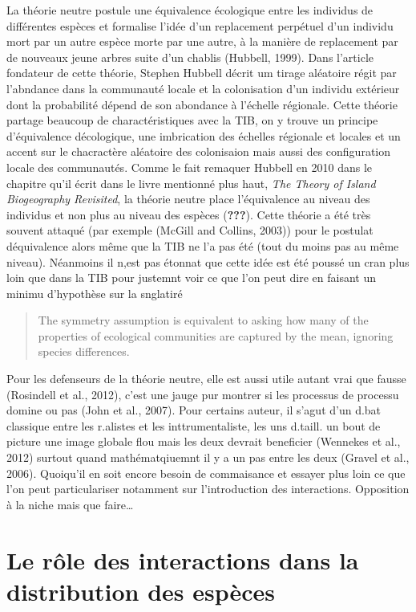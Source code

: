 La théorie neutre postule une équivalence écologique entre les individus
de différentes espèces et formalise l'idée d'un replacement perpétuel
d'un individu mort par un autre espèce morte par une autre, à la manière
de replacement par de nouveaux jeune arbres suite d'un chablis (Hubbell,
1999). Dans l'article fondateur de cette théorie, Stephen Hubbell décrit
um tirage aléatoire régit par l'abndance dans la communauté locale et la
colonisation d'un individu extérieur dont la probabilité dépend de son
abondance à l'échelle régionale. Cette théorie partage beaucoup de
charactéristiques avec la TIB, on y trouve un principe d'équivalence
décologique, une imbrication des échelles régionale et locales et un
accent sur le chacractère aléatoire des colonisaion mais aussi des
configuration locale des communautés. Comme le fait remaquer Hubbell en
2010 dans le chapitre qu'il écrit dans le livre mentionné plus haut,
\emph{The Theory of Island Biogeography Revisited}, la théorie neutre
place l'équivalence au niveau des individus et non plus au niveau des
espèces ({\textbf{???}}). Cette théorie a été très souvent attaqué (par
exemple (McGill and Collins, 2003)) pour le postulat déquivalence alors
même que la TIB ne l'a pas été (tout du moins pas au même niveau).
Néanmoins il n,est pas étonnat que cette idée est été poussé un cran
plus loin que dans la TIB pour justemnt voir ce que l'on peut dire en
faisant un minimu d'hypothèse sur la snglatiré

\begin{quote}
The symmetry assumption is equivalent to asking how many of the
properties of ecological communities are captured by the mean, ignoring
species differences.
\end{quote}

Pour les defenseurs de la théorie neutre, elle est aussi utile autant
vrai que fausse (Rosindell et al., 2012), c'est une jauge pur montrer si
les processus de processu domine ou pas (John et al., 2007). Pour
certains auteur, il s'agut d'un d.bat classique entre les r.alistes et
les inttrumentaliste, les uns d.taill. un bout de picture une image
globale flou mais les deux devrait beneficier (Wennekes et al., 2012)
surtout quand mathématqiuemnt il y a un pas entre les deux (Gravel et
al., 2006). Quoiqu'il en soit encore besoin de commaisance et essayer
plus loin ce que l'on peut particulariser notamment sur l'introduction
des interactions. Opposition à la niche mais que faire\ldots{}

\section*{Le rôle des interactions dans la distribution des
espèces}\label{le-ruxf4le-des-interactions-dans-la-distribution-des-espuxe8ces}

